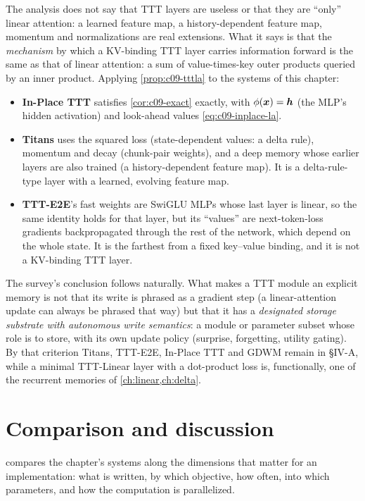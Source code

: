 The analysis does not say that TTT layers are useless or that they are ``only'' linear
attention: a learned feature map, a history-dependent feature map, momentum and normalizations
are real extensions. What it says is that the \emph{mechanism} by which a KV-binding TTT layer
carries information forward is the same as that of linear attention: a sum of value-times-key
outer products queried by an inner product. Applying \cref{prop:c09-tttla} to the systems of this
chapter:
\begin{itemize}
  \item \textbf{In-Place TTT} satisfies \cref{cor:c09-exact} exactly, with $\phi(\bm{x}) = \bm{h}$ (the
        MLP's hidden activation) and look-ahead values \eqref{eq:c09-inplace-la}.
  \item \textbf{Titans} uses the squared loss (state-dependent values: a delta rule), momentum
        and decay (chunk-pair weights), and a deep memory whose earlier layers are also trained
        (a history-dependent feature map). It is a delta-rule-type layer with a learned,
        evolving feature map.
  \item \textbf{TTT-E2E}'s fast weights are SwiGLU MLPs whose last layer is linear, so the same
        identity holds for that layer, but its ``values'' are next-token-loss gradients
        backpropagated through the rest of the network, which depend on the whole state. It is
        the farthest from a fixed key--value binding, and it is not a KV-binding TTT layer.
\end{itemize}
The survey's conclusion follows naturally. What makes a TTT module an explicit memory is not
that its write is phrased as a gradient step (a linear-attention update can always be phrased
that way) but that it has a \emph{designated storage substrate with autonomous write semantics}:
a module or parameter subset whose role is to store, with its own update policy (surprise,
forgetting, utility gating). By that criterion Titans, TTT-E2E, In-Place TTT and GDWM remain in
\S IV-A, while a minimal TTT-Linear layer with a dot-product loss is, functionally, one of the
recurrent memories of \cref{ch:linear,ch:delta}.

\section{Comparison and discussion}\label{sec:c09-comparison}

 compares the chapter's systems along the dimensions that matter for an
implementation: what is written, by which objective, how often, into which parameters, and how
the computation is parallelized.

